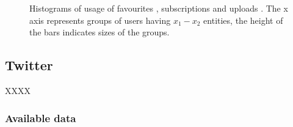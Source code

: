 \begin{figure}[ht]
  \centering
  \label{fig:subfigureExample}
  \caption{Histograms of usage of favourites , subscriptions
   and uploads . The x axis represents groups of
  users having $x_1-x_2$ entities, the height of the bars indicates sizes of the
  groups.}
\end{figure}

\newpage
\subsection{Twitter}

XXXX

\subsubsection{Available data}
